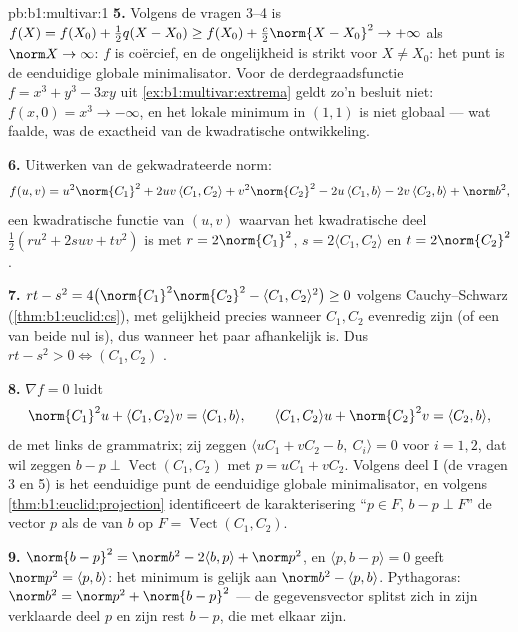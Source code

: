 \begin{solution}{pb:b1:multivar:1}
\textbf{5.} Volgens de vragen 3--4 is $f(X) = f(X_0) + \frac12 q(X
- X_0) \geq f(X_0) + \frac c2\norm{X - X_0}^2 \to +\infty$ als
$\norm X \to \infty$: $f$ is coërcief, en de ongelijkheid is strikt
voor $X \neq X_0$: het  punt is de eenduidige globale
minimalisator. Voor de derdegraadsfunctie $f = x^3 + y^3 - 3xy$ uit
\cref{ex:b1:multivar:extrema} geldt zo'n besluit niet: $f(x,0) =
x^3 \to -\infty$, en het lokale minimum in $(1,1)$ is niet globaal
--- wat faalde, was de exactheid van de kwadratische
ontwikkeling.

\textbf{6.} Uitwerken van de gekwadrateerde norm:
\[
f(u,v) = u^2\norm{C_1}^2 + 2uv\,\langle C_1, C_2\rangle +
v^2\norm{C_2}^2 - 2u\,\langle C_1, b\rangle - 2v\,\langle C_2,
b\rangle + \norm b^2 ,
\]
een kwadratische functie van $(u, v)$ waarvan het kwadratische deel
$\frac12(ru^2 + 2suv + tv^2)$ is met $r = 2\norm{C_1}^2$, $s =
2\langle C_1, C_2\rangle$ en $t = 2\norm{C_2}^2$.

\textbf{7.} $rt - s^2 = 4\bigl(\norm{C_1}^2\norm{C_2}^2 - \langle
C_1, C_2\rangle^2\bigr) \geq 0$ volgens Cauchy--Schwarz
(\cref{thm:b1:euclid:cs}), met gelijkheid precies wanneer $C_1,
C_2$ evenredig zijn (of een van beide nul is), dus wanneer het paar
afhankelijk is. Dus $rt - s^2 > 0 \iff (C_1, C_2)$ .

\textbf{8.} $\nabla f = 0$ luidt
\[
\norm{C_1}^2 u + \langle C_1, C_2\rangle v = \langle C_1,
b\rangle,
\qquad
\langle C_1, C_2\rangle u + \norm{C_2}^2 v = \langle C_2,
b\rangle,
\]
de  met links de grammatrix; zij zeggen
$\langle uC_1 + vC_2 - b,\ C_i\rangle = 0$ voor $i = 1, 2$, dat wil
zeggen $b - p \perp \operatorname{Vect}(C_1, C_2)$ met $p = uC_1 +
vC_2$. Volgens deel I (de vragen 3 en 5) is het eenduidige 
punt de eenduidige globale minimalisator, en volgens
\cref{thm:b1:euclid:projection} identificeert de karakterisering
``$p \in F$, $b - p \perp F$'' de vector $p$ als de  van $b$ op $F = \operatorname{Vect}(C_1, C_2)$.

\textbf{9.} $\norm{b - p}^2 = \norm b^2 - 2\langle b, p\rangle +
\norm p^2$, en $\langle p, b - p\rangle = 0$ geeft $\norm p^2 =
\langle p, b\rangle$: het minimum is gelijk aan $\norm b^2 -
\langle p, b\rangle$. Pythagoras: $\norm b^2 = \norm p^2 + \norm{b
- p}^2$ --- de gegevensvector splitst zich in zijn verklaarde deel
$p$ en zijn rest $b - p$, die  met elkaar zijn.


\end{solution}
